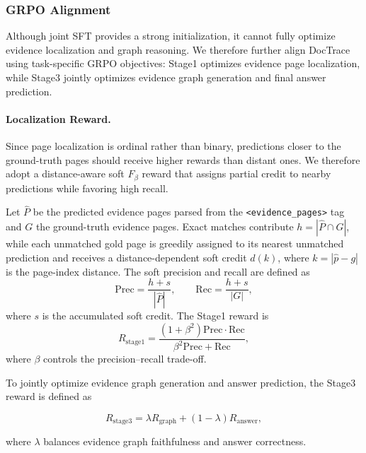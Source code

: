 \documentclass[letterpaper]{article} %
\begin{document}
\subsubsection{GRPO Alignment}

Although joint SFT provides a strong initialization, it cannot fully optimize evidence localization and graph reasoning. We therefore further align DocTrace using task-specific GRPO objectives: Stage1 optimizes evidence page localization, while Stage3 jointly optimizes evidence graph generation and final answer prediction.



\paragraph{Localization Reward.}

Since page localization is ordinal rather than binary, predictions closer to the ground-truth pages should receive higher rewards than distant ones. We therefore adopt a distance-aware soft $F_{\beta}$ reward that assigns partial credit to nearby predictions while favoring high recall.

Let $\hat{P}$ be the predicted evidence pages parsed from the \texttt{<evidence\_pages>} tag and $G$ the ground-truth evidence pages. Exact matches contribute $h=|\hat{P}\cap G|$, while each unmatched gold page is greedily assigned to its nearest unmatched prediction and receives a distance-dependent soft credit $d(k)$, where $k=|\hat{p}-g|$ is the page-index distance. The soft precision and recall are defined as
\begin{equation}
\mathrm{Prec}=\frac{h+s}{|\hat{P}|},
\qquad
\mathrm{Rec}=\frac{h+s}{|G|},
\end{equation}
where $s$ is the accumulated soft credit. The Stage1 reward is
\begin{equation}
R_{\text{stage1}}
=
\frac{(1+\beta^2)\mathrm{Prec}\cdot\mathrm{Rec}}
{\beta^2\mathrm{Prec}+\mathrm{Rec}},
\end{equation}
where $\beta$ controls the precision--recall trade-off.


To jointly optimize evidence graph generation and answer prediction, the Stage3 reward is defined as

\begin{equation}
R_{\mathrm{stage3}}
=
\lambda
R_{\mathrm{graph}}
+
(1-\lambda)
R_{\mathrm{answer}},
\end{equation}

where $\lambda$ balances evidence graph faithfulness and answer correctness.
\end{document}
